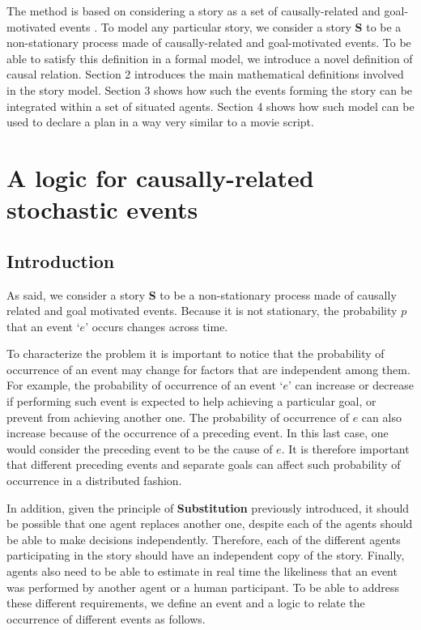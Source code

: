 \documentclass[
		twoside,openright,titlepage,numbers=noenddot,manychapters,
		headinclude,%
                footinclude=false,cleardoublepage=empty,
                BCOR=5mm,
		fontsize=11pt, %
                 enabledeprecatedfontcommands]{scrreprt}
\begin{document}
The method is based on considering a story as a set of causally-related and goal-motivated events \cite[]{stein1982ds}. To model any particular story, we consider a story \textbf{S} to be a non-stationary process made of causally-related and goal-motivated events. To be able to satisfy this definition in a formal model, we introduce a novel definition of causal relation. Section 2 introduces the main mathematical definitions involved in the story model. Section 3 shows how such the events forming the story can be integrated within a set of situated agents. Section 4 shows how such model can be used to declare a plan in a way very similar to a movie script. 


\section{A logic for causally-related stochastic events}
\subsection{Introduction}

As said, we consider a story \textbf{S} to be a non-stationary process made of causally related and goal motivated events. Because it is not stationary, the probability $p$ that an event ‘$e$’ occurs changes across time. 

To characterize the problem it is important to notice that the probability of occurrence of an event may change for factors that are independent among them. For example, the probability of occurrence of an event `$e$' can increase or decrease if performing such event is expected to help achieving a particular goal, or prevent from achieving another one. The probability of occurrence of $e$ can also increase because of the occurrence of a preceding event. In this last case, one would consider the preceding event to be the cause of $e$.
 It is therefore important that different preceding events and separate goals can affect such probability of occurrence in a distributed fashion. %

In addition, given the principle of \textbf{Substitution} previously introduced, it should be possible that one agent replaces another one, despite each of the agents should be able to make decisions independently. Therefore, each of the different agents participating in the story should have an independent copy of the story. Finally, agents also need to be able to estimate in real time the likeliness that an event was performed by another agent or a human participant. To be able to address these different requirements, we define an event and a logic to relate the occurrence of different events as follows.
\end{document}
